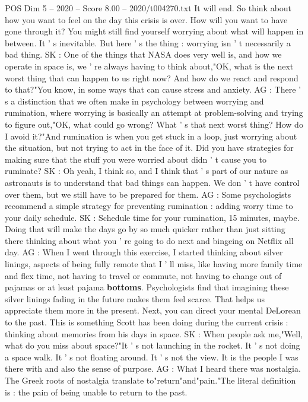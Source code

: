 \begin{textsample}{POS Dim 5 – 2020 – Score 8.00 – 2020/t004270.txt}
It will end.
So think about how you want to feel on the day this crisis is over.
How will you want to have gone through it?
You might still find yourself worrying about what will happen in between.
It ' s inevitable.
But here ' s the thing : worrying isn ' t necessarily a bad thing.
SK : One of the things that NASA does very well is, and how we operate in space is, we ' re always having to think about,"OK, what is the next worst thing that can happen to us right now?
And how do we react and respond to that?"You know, in some ways that can cause stress and anxiety.
AG : There ' s a distinction that we often make in psychology between worrying and rumination, where worrying is basically an attempt at problem-solving and trying to figure out,"OK, what could go wrong?
What ' s that next worst thing?
How do I avoid it?"And rumination is when you get stuck in a loop, just worrying about the situation, but not trying to act in the face of it.
Did you have strategies for making sure that the stuff you were worried about didn ' t cause you to ruminate?
SK : Oh yeah, I think so, and I think that ' s part of our nature as astronauts is to understand that bad things can happen.
We don ' t have control over them, but we still have to be prepared for them.
AG : Some psychologists recommend a simple strategy for preventing rumination : adding worry time to your daily schedule.
SK : Schedule time for your rumination, 15 minutes, maybe.
Doing that will make the days go by so much quicker rather than just sitting there thinking about what you ' re going to do next and bingeing on Netflix all day.
AG : When I went through this exercise, I started thinking about silver linings, aspects of being fully remote that I ' ll miss, like having more family time and flex time, not having to travel or commute, not having to change out of pajamas or at least pajama \textbf{bottoms}.
Psychologists find that imagining these silver linings fading in the future makes them feel scarce.
That helps us appreciate them more in the present.
Next, you can direct your mental DeLorean to the past.
This is something Scott has been doing during the current crisis : thinking about memories from his days in space.
SK : When people ask me,"Well, what do you miss about space?"It ' s not launching in the rocket.
It ' s not doing a space walk.
It ' s not floating around.
It ' s not the view.
It is the people I was there with and also the sense of purpose.
AG : What I heard there was nostalgia.
The Greek roots of nostalgia translate to"return"and"pain."The literal definition is : the pain of being unable to return to the past.

\end{textsample}
